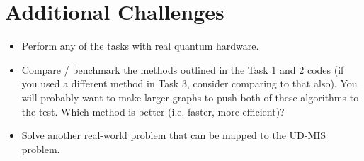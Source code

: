 \documentclass[12pt]{article}
\begin{document}
\section*{Additional Challenges}

\begin{itemize}
	\item Perform any of the tasks with real quantum hardware.
	\item Compare / benchmark the methods outlined in the Task 1 and 2 codes (if you used a different method in Task 3, consider comparing to that also). You will probably want to make larger graphs to push both of these algorithms to the test. Which method is better (i.e. faster, more efficient)?
	\item Solve another real-world problem that can be mapped to the UD-MIS problem.
\end{itemize}



\end{document}
